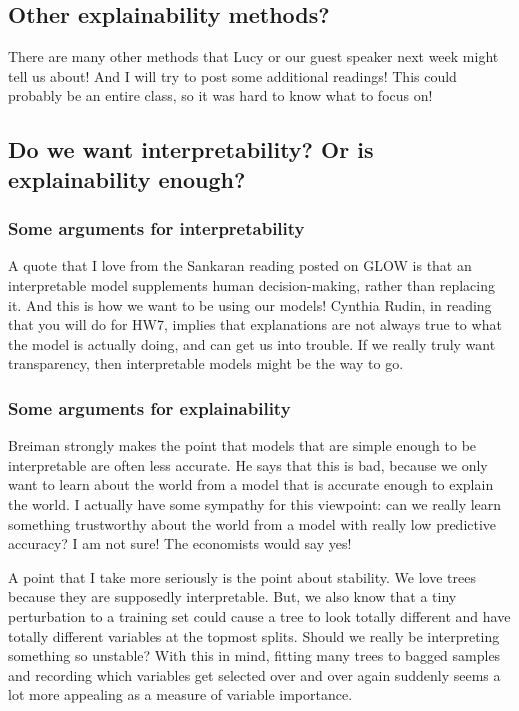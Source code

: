 \subsection{Other explainability methods?}

There are many other methods that Lucy or our guest speaker next week might tell us about! And I will try to post some additional readings! This could probably be an entire class, so it was hard to know what to focus on!

\subsection{Do we want interpretability? Or is explainability enough?}

\subsubsection{Some arguments for interpretability}

A quote that I love from the Sankaran reading posted on GLOW is that an interpretable model supplements human decision-making, rather than replacing it. And this is how we want to be using our models! Cynthia Rudin, in reading that you will do for HW7, implies that explanations are not always true to what the model is actually doing, and can get us into trouble. If we really truly want transparency, then interpretable models might be the way to go. 

\subsubsection{Some arguments for explainability}

Breiman strongly makes the point that models that are simple enough to be interpretable are often less accurate. He says that this is bad, because we only want to learn about the world from a model that is accurate enough to explain the world. I actually have some sympathy for this viewpoint: can we really learn something trustworthy about the world from a model with really low predictive accuracy? I am not sure! The economists would say yes!

A point that I take more seriously is the point about stability. We love trees because they are supposedly interpretable. But, we also know that a tiny perturbation to a training set could cause a tree to look totally different and have totally different variables at the topmost splits. Should we really be interpreting something so unstable? With this in mind, fitting many trees to bagged samples and recording which variables get selected over and over again suddenly seems a lot more appealing as a measure of variable importance.

